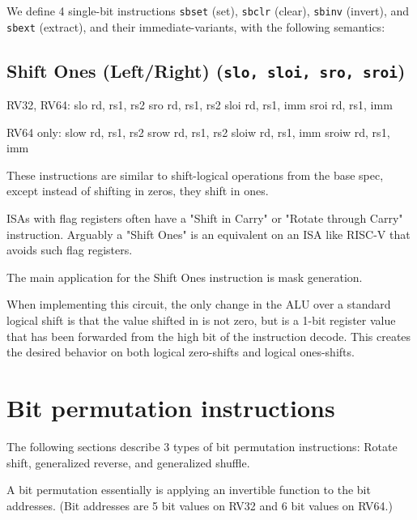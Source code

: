 We define 4 single-bit instructions \texttt{sbset} (set), \texttt{sbclr} (clear),
\texttt{sbinv} (invert), and \texttt{sbext} (extract), and their immediate-variants,
with the following semantics:




\subsection{Shift Ones (Left/Right) (\texttt{slo,\ sloi,\ sro,\ sroi})}

\begin{rvb}
  RV32, RV64:
    slo  rd, rs1, rs2
    sro  rd, rs1, rs2
    sloi rd, rs1, imm
    sroi rd, rs1, imm

  RV64 only:
    slow  rd, rs1, rs2
    srow  rd, rs1, rs2
    sloiw rd, rs1, imm
    sroiw rd, rs1, imm
\end{rvb}

These instructions are similar to shift-logical operations from the base
spec, except instead of shifting in zeros, they shift in ones.



ISAs with flag registers often have a "Shift in Carry" or "Rotate through Carry" instruction.
Arguably a "Shift Ones" is an equivalent on an ISA like RISC-V that avoids such flag registers.

The main application for the Shift Ones instruction is mask generation.

When implementing this circuit, the only change in the ALU over a
standard logical shift is that the value shifted in is not zero, but is
a 1-bit register value that has been forwarded from the high bit of the
instruction decode. This creates the desired behavior on both logical
zero-shifts and logical ones-shifts.


\section{Bit permutation instructions}

The following sections describe 3 types of bit permutation instructions: Rotate
shift, generalized reverse, and generalized shuffle.

A bit permutation essentially is applying an invertible function to the bit addresses. (Bit
addresses are 5 bit values on RV32 and 6 bit values on RV64.)

